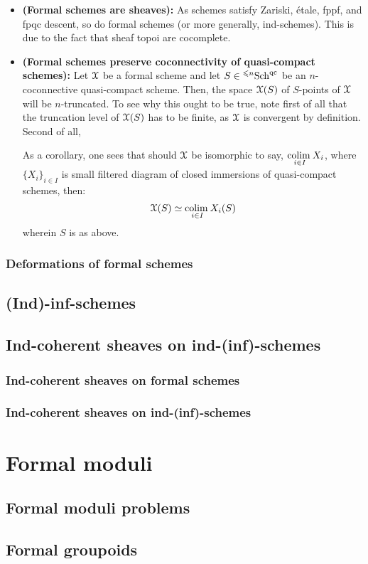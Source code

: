             \begin{remark} \label{remark: geometric_facts_about_formal_schemes}
                \noindent
                \begin{itemize}
                    \item \textbf{(Formal schemes are sheaves):} As schemes satisfy Zariski, \'etale, fppf, and fpqc descent, so do formal schemes (or more generally, ind-schemes). This is due to the fact that sheaf topoi are cocomplete.
                    \item \textbf{(Formal schemes preserve coconnectivity of quasi-compact schemes):} Let $\mathcal{X}$ be a formal scheme and let $S \in {}^{\leqslant n}\mathrm{Sch}^{\mathrm{qc}}$ be an $n$-coconnective quasi-compact scheme. Then, the space $\mathcal{X}(S)$ of $S$-points of $\mathcal{X}$ will be $n$-truncated. To see why this ought to be true, note first of all that the truncation level of $\mathcal{X}(S)$ has to be finite, as $\mathcal{X}$ is convergent by definition. Second of all, 
                    
                    As a corollary, one sees that should $\mathcal{X}$ be isomorphic to say, $\underset{i \in I}{\operatorname{colim} \:} X_i$, where $\{X_i\}_{i \in I}$ is small filtered diagram of closed immersions of quasi-compact schemes, then:
                        $$\mathcal{X}(S) \simeq \underset{i \in I}{\operatorname{colim} \:} X_i(S)$$
                    wherein $S$ is as above.
                \end{itemize}
            \end{remark}
            
        \subsubsection{Deformations of formal schemes}
    
    \subsection{(Ind)-inf-schemes}
    
    \subsection{Ind-coherent sheaves on ind-(inf)-schemes}
        \subsubsection{Ind-coherent sheaves on formal schemes}
        
        \subsubsection{Ind-coherent sheaves on ind-(inf)-schemes}
    
\section{Formal moduli}
    \subsection{Formal moduli problems}
    
    \subsection{Formal groupoids}